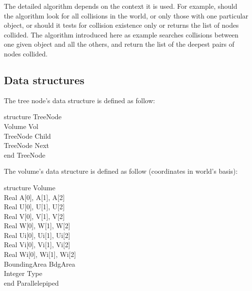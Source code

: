 \documentclass[12pt, a4paper]{article}
\begin{document}
The detailed algorithm depends on the context it is used. For example, should the algorithm look for all collisions in the world, or only those with one particular object, or should it tests for collision existence only or returns the list of nodes collided. The algorithm introduced here as example searches collisions between one given object and all the others, and return the list of the deepest pairs of nodes collided.

\subsection{Data structures}

The tree node's data structure is defined as follow:\\

\begin{ttfamily}
\noindent structure TreeNode\\
\hspace*{1em} Volume Vol\\
\hspace*{1em} TreeNode Child\\
\hspace*{1em} TreeNode Next\\
end TreeNode\\
\end{ttfamily}

\noindent The volume's data structure is defined as follow (coordinates in world's basis):\\

\begin{ttfamily}
\noindent structure Volume\\
\hspace*{1em} Real A[0], A[1], A[2]\\
\hspace*{1em} Real U[0], U[1], U[2]\\
\hspace*{1em} Real V[0], V[1], V[2]\\
\hspace*{1em} Real W[0], W[1], W[2]\\
\hspace*{1em} Real Ui[0], Ui[1], Ui[2]\\
\hspace*{1em} Real Vi[0], Vi[1], Vi[2]\\
\hspace*{1em} Real Wi[0], Wi[1], Wi[2]\\
\hspace*{1em} BoundingArea BdgArea\\
\hspace*{1em} Integer Type\\
end Parallelepiped\\
\end{ttfamily}
\end{document}
